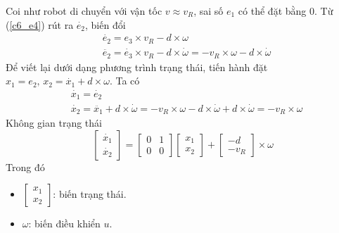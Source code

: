           \hspace*{0.6cm}Coi như robot di chuyển với vận tốc $v \approx v_R$, sai số $e_1$ có thể đặt bằng 0. Từ (\ref{c6_e4}) rút ra $\dot{e_2}$, biến đổi 
          \begin{align*}
               &\dot{e_2} = e_3 \times v_R - d \times \omega\\
               &\ddot{e_2} = \dot{e_3} \times v_R - d \times \dot{\omega} = - v_R \times \omega - d \times \dot{\omega}
          \end{align*}
          \hspace{0.6cm}Để viết lại dưới dạng phương trình trạng thái, tiến hành đặt $x_1 = e_2, \, x_2 = \dot{x_1} + d\times \omega$. Ta có
          \begin{align*}
               &\dot{x_1} = \dot{e_2}\\
               &\dot{x_2} = \ddot{x_1} + d \times \dot{\omega} = -v_R \times \omega - d \times \dot{\omega} + d \times \dot{\omega} = -v_R \times \omega
          \end{align*}
          \hspace{0.6cm}Không gian trạng thái
          \begin{equation*}
               \begin{bmatrix}
                    \dot{x_1} \\
                    \dot{x_2}
               \end{bmatrix} = \begin{bmatrix}
                    0 & 1 \\
                    0 & 0
               \end{bmatrix}
               \begin{bmatrix}
                    x_1 \\ 
                    x_2
               \end{bmatrix} + \begin{bmatrix}
                    -d \\
                    -v_R
               \end{bmatrix} \times \omega
          \end{equation*}
          \hspace{0.6cm}Trong đó
          \begin{itemize}
               \item $\begin{bmatrix}
                    x_1 \\
                    x_2
               \end{bmatrix}$: biến trạng thái.
               \item $\omega$: biến điều khiển $u$.
          \end{itemize}
